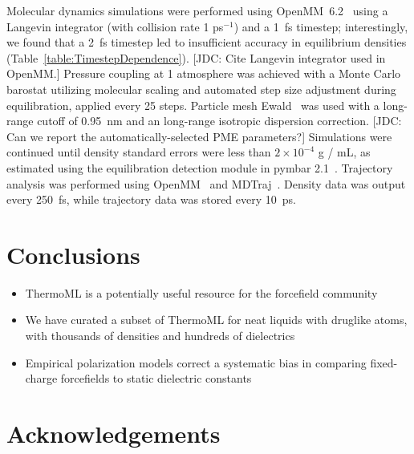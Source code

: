 \documentclass[aps,pre,twocolumn,nofootinbib,superscriptaddress,linenumbers]{revtex4-1}
\begin{document}
Molecular dynamics simulations were performed using OpenMM~6.2~\cite{eastman2012openmm} using a Langevin integrator (with collision rate 1 ps$^{-1}$) and a 1~fs timestep; interestingly, we found that a 2~fs timestep led to insufficient accuracy in equilibrium densities (Table~\ref{table:TimestepDependence}).  
{\color{red}[JDC: Cite Langevin integrator used in OpenMM.]}
Pressure coupling at 1 atmosphere was achieved with a Monte Carlo barostat utilizing molecular scaling and automated step size adjustment during equilibration, applied every 25 steps.  
Particle mesh Ewald~\cite{Darden1993} was used with a long-range cutoff of 0.95~nm and an long-range isotropic dispersion correction.  
{\color{red}[JDC: Can we report the automatically-selected PME parameters?]}
Simulations were continued until density standard errors were less than $2 \times 10^{-4}$ g / mL, as estimated using the equilibration detection module in pymbar 2.1~\cite{shirts2008statistically}.  
Trajectory analysis was performed using OpenMM~\cite{eastman2012openmm} and MDTraj~\cite{mcgibbon2014mdtraj}.  
Density data was output every 250~fs, while trajectory data was stored every 10~ps.  


\section{Conclusions}

\begin{itemize}
\item  ThermoML is a potentially useful resource for the forcefield community
\item  We have curated a subset of ThermoML for neat liquids with druglike atoms, with thousands of densities and hundreds of dielectrics
\item  Empirical polarization models correct a systematic bias in comparing fixed-charge forcefields to static dielectric constants
\end{itemize}


\section{Acknowledgements}
\end{document}
